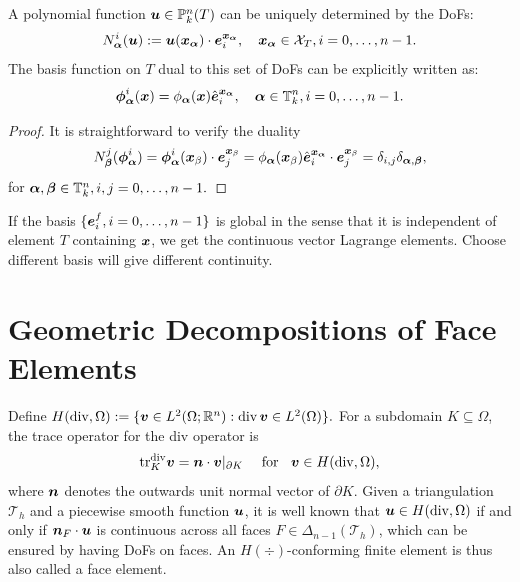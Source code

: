 \documentclass[mathpazo]{cicp}
\begin{document}
\begin{corollary}\label{cor:basisfunctions}
    A polynomial function $\bs u \in \mathbb P_k^n(T)$ can be uniquely determined by the DoFs:
  $$
N^i_{\bs \alpha }(\bs u):=  \bs u(\bs x_{\bs \alpha})\cdot \bs e^{\bs x_{\bs \alpha}}_i, \quad \bs x_{\bs \alpha} \in \mathcal X_{T}, i = 0,\ldots, n-1.
  $$
  The basis function on $T$ dual to this set of DoFs can be 
  explicitly written as:
  $$
  \bs{\phi}_{\bs \alpha}^i(\bs x) = 
  \phi_{\bs\alpha}(\bs x) \hat{\bs e}^{\bs x_{\bs \alpha}}_i, \quad 
  \boldsymbol \alpha \in \mathbb T^n_k, i = 0, \ldots, n-1.
  $$
\end{corollary}
 \begin{proof}
It is straightforward to verify the duality
$$
N^j_{\bs \beta }(\bs{\phi}_{\bs \alpha}^i) =   \bs{\phi}_{\bs \alpha}^i(\bs x_{\beta}) \cdot \bs e^{\bs x_{\beta}}_j  =   \phi_{\bs \alpha}(\bs x_{\beta}) \hat{\bs e}^{\bs x_{\bs \alpha}}_i \cdot \bs e^{\bs x_{\beta}}_j  = \delta_{i,j} \delta_{\bs \alpha,\bs \beta},
$$ 
for $\bs \alpha, \bs \beta\in  \mathbb T^n_k, i,j = 0,\ldots, n-1.$
\end{proof}
If the basis $\{\bs e_i^{f}, i=0,\ldots, n-1\}$ is global in the sense that it is independent of element $T$ containing $\bs x$, we get the continuous vector Lagrange elements. Choose different basis will give different continuity.

\section{Geometric Decompositions of Face Elements}\label{sec:facefem}
Define $H(\div, \Omega):=\{\bs v\in L^2(\Omega;\mathbb R^n): \div \bs v\in L^2(\Omega)\}.$ For a subdomain $K\subseteq \Omega$, the trace operator for the div operator is
$$
{\rm tr}_K^{\div} \boldsymbol v = \boldsymbol n\cdot \boldsymbol v|_{\partial K} \quad \textrm{ for }\;\;\boldsymbol{v}\in H(\div, \Omega),
$$
where $\bs n$ denotes the outwards unit normal vector of $\partial K$. 
Given a triangulation $\mathcal T_h$ and a piecewise smooth function $\bs u$, it is well known that $\bs u\in H(\div, \Omega)$ if and only if $\bs n_F \cdot \bs u$ is continuous across all faces $F\in \Delta_{n-1}(\mathcal T_h)$, which can be ensured by having DoFs on faces. %
An $H(\div)$-conforming finite element is thus also called a face element.

\end{document}
